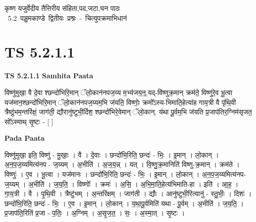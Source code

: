 \documentclass[17pt]{extarticle}
\begin{document}
\begin{titlepage}
    \begin{center}
 
\begin{sanskrit}
    { \Large
    कृष्ण यजुर्वेदीय तैत्तिरीय संहिता,पद,जटा,घन पाठः 
    }
    \\
    \vspace{2.5cm}
    \mbox{ \Large
    5.2      पञ्चमकाण्डे द्वितीयः प्रश्नः - चित्युपक्रमाभिधानं   }
\end{sanskrit}
\end{center}

\end{titlepage}
\tableofcontents
{}
\pagebreak


\section{ TS 5.2.1.1 }

\textbf{TS 5.2.1.1 } \newline
\textbf{Samhita Paata} \newline

विष्णु॑मुखा॒ वै दे॒वा श्छन्दो॑भिरि॒मान् ॅलो॒कान॑नपज॒य्य म॒भ्य॑जय॒न्॒.यद्-वि॑ष्णुक्र॒मान् क्रम॑ते॒ विष्णु॑रे॒व भू॒त्वा यज॑मान॒श्छन्दो॑भिरि॒मान् ॅलो॒कान॑नपज॒य्यम॒भि ज॑यति॒ विष्णोः॒ क्रमो᳚ऽस्य-भिमाति॒हेत्या॑ह गाय॒त्री वै पृ॑थि॒वी त्रैष्ठु॑भम॒न्तरि॑क्षं॒ जाग॑ती॒ द्यौरानु॑ष्टुभी॒र्दिश॒ श्छन्दो॑भिरे॒वेमान् ॅलो॒कान्. य॑था पू॒र्वम॒भि ज॑यति प्र॒जाप॑तिर॒ग्निम॑सृजत॒ सो᳚ऽस्माथ् सृ॒ष्टः - [  ] \newline

\textbf{Pada Paata} \newline

विष्णु॑मुखा॒ इति॒ विष्णु॑ - मु॒खाः॒ । वै । दे॒वाः । छन्दो॑भि॒रिति॒ छन्दः॑ - भिः॒ । इ॒मान् । लो॒कान् । अ॒न॒प॒ज॒य्यमित्य॑नप - ज॒य्यम् । अ॒भीति॑ । अ॒ज॒य॒न्न् । यत् । वि॒ष्णु॒क्र॒मानिति॑ विष्णु-क्र॒मान् । क्रम॑ते । विष्णुः॑ । ए॒व । भू॒त्वा । यज॑मानः । छन्दो॑भि॒रिति॒ छन्दः॑ - भिः॒ । इ॒मान् । लो॒कान् । अ॒न॒प॒ज॒य्यमित्य॑नप-ज॒य्यम् । अ॒भीति॑ । ज॒य॒ति॒ । विष्णोः᳚ । क्रमः॑ । अ॒सि॒ । अ॒भि॒मा॒ति॒हेत्य॑भिमाति-हा । इति॑ । आ॒ह॒ । गा॒य॒त्री । वै । पृ॒थि॒वी । त्रैष्टु॑भम् । अ॒न्तरि॑क्षम् । जाग॑ती । द्यौः । आनु॑ष्टुभी॒रित्यानु॑ - स्तु॒भीः॒ । दिशः॑ । छन्दो॑भि॒रिति॒ छन्दः॑ - भिः॒ । ए॒व । इ॒मान् । लो॒कान् । य॒था॒पू॒र्वमिति॑ यथा - पू॒र्वम् । अ॒भीति॑ । ज॒य॒ति॒ । प्र॒जाप॑ति॒रिति॑ प्र॒जा - प॒तिः॒ । अ॒ग्निम् । अ॒सृ॒ज॒त॒ । सः॒ । अ॒स्मा॒त् । सृ॒ष्टः ।  \newline
\end{document}
